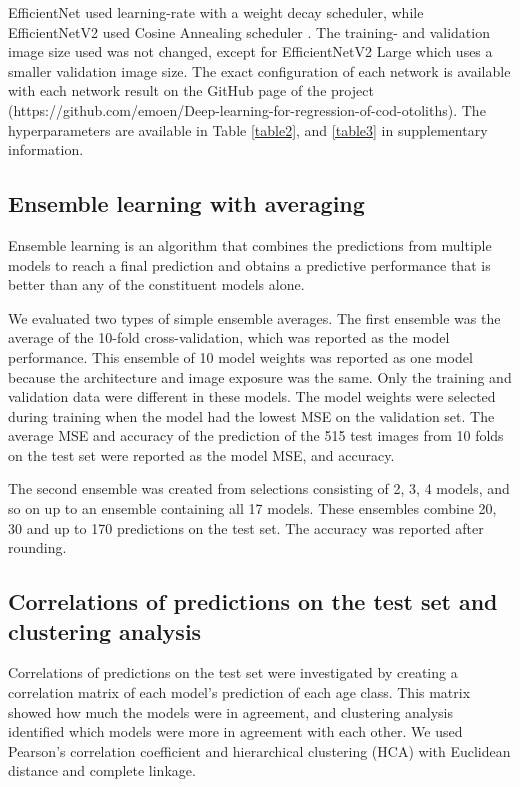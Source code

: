 \documentclass[10pt,letterpaper]{article}
\begin{document}
EfficientNet used learning-rate with a weight decay scheduler, while EfficientNetV2 
used Cosine Annealing scheduler \citep{Loshchilovetal}. The training- and validation 
image size used was not changed, except for EfficientNetV2 Large which uses a smaller validation image size. The exact configuration of each network is available with each network result on the GitHub page of the project (https://github.com/emoen/Deep-learning-for-regression-of-cod-otoliths). The hyperparameters are available in Table \ref{table2}, and \ref{table3} in supplementary information.

\subsection{Ensemble learning with averaging}

Ensemble learning is an algorithm that combines the predictions from multiple models to reach a final prediction and obtains a predictive performance that is better than any of the constituent models alone.

We evaluated two types of simple ensemble averages. The first ensemble was the average of the 10-fold cross-validation, which was reported as the model performance. This ensemble of 10 model weights was reported as one model because the architecture and image exposure was the same. Only the training and validation data were different in these models. The model weights were selected during training when the model had the lowest MSE on the validation set. The average MSE and accuracy of the prediction of the 515 test images from 10 folds on the test set were reported as the model MSE, and accuracy.

The second ensemble was created from selections consisting of 2, 3, 4 models, and so on up to an ensemble containing all 17 models. These ensembles combine 20, 30 and up to 170 predictions on the test set. The accuracy was reported after rounding. 

\subsection{Correlations of predictions on the test set and clustering analysis}

Correlations of predictions on the test set were investigated by creating a correlation matrix of each model's prediction of each age class. This matrix showed how much the models were in agreement, and clustering analysis identified which models were more in agreement with each other.  We used Pearson's correlation coefficient and hierarchical clustering (HCA) with Euclidean distance and complete linkage. 
\end{document}
